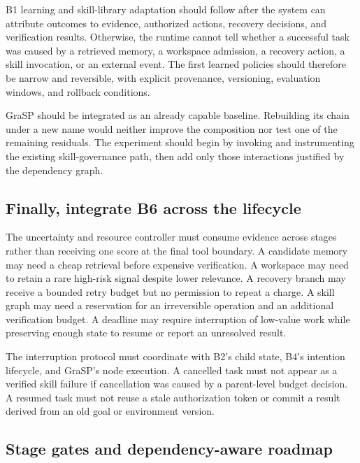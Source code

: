 B1 learning and skill-library adaptation should follow after the system can attribute outcomes to evidence, authorized actions, recovery decisions, and verification results. Otherwise, the runtime cannot tell whether a successful task was caused by a retrieved memory, a workspace admission, a recovery action, a skill invocation, or an external event. The first learned policies should therefore be narrow and reversible, with explicit provenance, versioning, evaluation windows, and rollback conditions.

GraSP should be integrated as an already capable baseline. Rebuilding its chain under a new name would neither improve the composition nor test one of the remaining residuals. The experiment should begin by invoking and instrumenting the existing skill-governance path, then add only those interactions justified by the dependency graph.

\subsection{Finally, integrate B6 across the lifecycle}
\label{subsec:ch18-integrate-b6}

The uncertainty and resource controller must consume evidence across stages rather than receiving one score at the final tool boundary. A candidate memory may need a cheap retrieval before expensive verification. A workspace may need to retain a rare high-risk signal despite lower relevance. A recovery branch may receive a bounded retry budget but no permission to repeat a charge. A skill graph may need a reservation for an irreversible operation and an additional verification budget. A deadline may require interruption of low-value work while preserving enough state to resume or report an unresolved result.

The interruption protocol must coordinate with B2's child state, B4's intention lifecycle, and GraSP's node execution. A cancelled task must not appear as a verified skill failure if cancellation was caused by a parent-level budget decision. A resumed task must not reuse a stale authorization token or commit a result derived from an old goal or environment version.

\subsection{Stage gates and dependency-aware roadmap}
\label{subsec:ch18-stage-gates}

